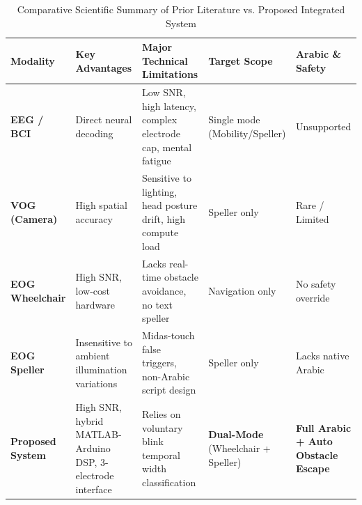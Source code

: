 \begin{table}[H]
  \centering
  \caption{Comparative Scientific Summary of Prior Literature vs. Proposed Integrated System}
  \label{tab:literature_review_summary}
  \small
  \begin{tabularx}{\textwidth}{@{} p{2.2cm} X X p{2.0cm} p{2.4cm} @{}}
    \toprule
    \textbf{Modality} & \textbf{Key Advantages} & \textbf{Major Technical Limitations} & \textbf{Target Scope} & \textbf{Arabic \& Safety} \\
    \midrule
    \textbf{EEG / BCI} \cite{liu2024multimodal, wolpaw2002bci} & Direct neural decoding & Low SNR, high latency, complex electrode cap, mental fatigue & Single mode (Mobility/Speller) & Unsupported \\
    \midrule
    \textbf{VOG (Camera)} \cite{eyedriven2026review} & High spatial accuracy & Sensitive to lighting, head posture drift, high compute load & Speller only & Rare / Limited \\
    \midrule
    \textbf{EOG Wheelchair} \cite{barea2002eog, hybrid2019wheelchair} & High SNR, low-cost hardware & Lacks real-time obstacle avoidance, no text speller & Navigation only & No safety override \\
    \midrule
    \textbf{EOG Speller} \cite{kumar2016eog, kabbara2015efficient} & Insensitive to ambient illumination variations & Midas-touch false triggers, non-Arabic script design & Speller only & Lacks native Arabic \\
    \midrule
    \textbf{Proposed System} & High SNR, hybrid MATLAB-Arduino DSP, 3-electrode interface & Relies on voluntary blink temporal width classification & \textbf{Dual-Mode} (Wheelchair + Speller) & \textbf{Full Arabic + Auto Obstacle Escape} \\
    \bottomrule
  \end{tabularx}
\end{table}

